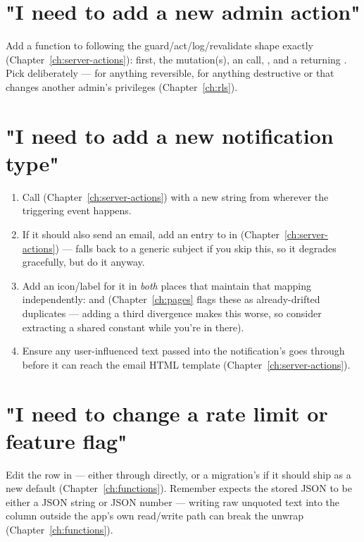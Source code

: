 \section{"I need to add a new admin action"}
Add a function to  following the guard/act/log/revalidate shape exactly (Chapter~\ref{ch:server-actions}):  first, the mutation(s), an  call, , and a  returning . Pick  deliberately —  for anything reversible,  for anything destructive or that changes another admin's privileges (Chapter~\ref{ch:rls}).

\section{"I need to add a new notification type"}
\begin{enumerate}
  \item Call  (Chapter~\ref{ch:server-actions}) with a new  string from wherever the triggering event happens.
  \item If it should also send an email, add an entry to  in  (Chapter~\ref{ch:server-actions}) — falls back to a generic subject if you skip this, so it degrades gracefully, but do it anyway.
  \item Add an icon/label for it in \emph{both} places that maintain that mapping independently:  and  (Chapter~\ref{ch:pages} flags these as already-drifted duplicates — adding a third divergence makes this worse, so consider extracting a shared constant while you're in there).
  \item Ensure any user-influenced text passed into the notification's  goes through  before it can reach the email HTML template (Chapter~\ref{ch:server-actions}).
\end{enumerate}

\section{"I need to change a rate limit or feature flag"}
Edit the row in  — either through  directly, or a migration's  if it should ship as a new default (Chapter~\ref{ch:functions}). Remember  expects the stored JSON to be either a JSON string or JSON number — writing raw unquoted text into the  column outside the app's own read/write path can break the  unwrap (Chapter~\ref{ch:functions}).

